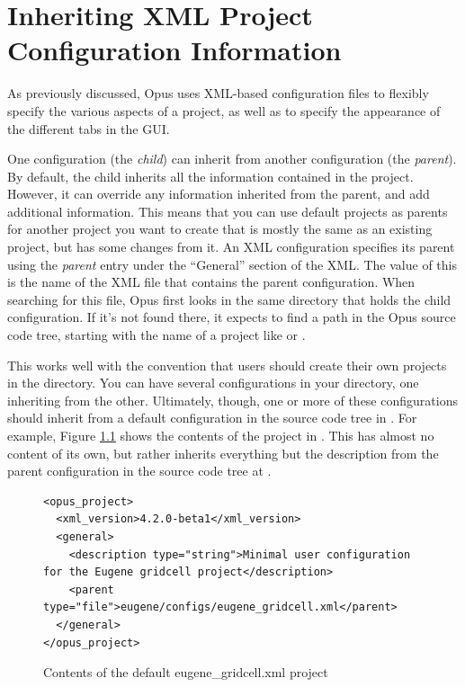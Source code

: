 \chapter{Inheriting XML Project Configuration Information}
\label{chapter:xml-inheritance}

As previously discussed, Opus uses XML-based configuration files to
flexibly specify the various aspects of a project, as well as to specify the
appearance of the different tabs in the GUI\@.

One configuration (the \emph{child}) can inherit from another configuration
(the \emph{parent}).  By default, the child inherits all the information
contained in the project.  However, it can override any information
inherited from the parent, and add additional information.  This means that
you can use default projects as parents for another project you want to
create that is mostly the same as an existing project, but has some changes
from it.  An XML configuration specifies its parent using the \emph{parent}
entry under the ``General'' section of the XML\@.  The value of this is the
name of the XML file that contains the parent configuration.  When
searching for this file, Opus first looks in the same directory that holds
the child configuration.  If it's not found there, it expects to find a
path in the Opus source code tree, starting with the name of a project like
 or .

This works well with the convention that users should create their own
projects in the  directory.  You can have
several configurations in your  directory, one
inheriting from the other.  Ultimately, though, one or more of these
configurations should inherit from a default configuration in the source
code tree in .  For example, Figure
\ref{fig:eugene-gridcell-xml-default} shows the contents of the
 project in .  This
has almost no content of its own, but rather inherits everything but the
description from the parent configuration in the source code tree at
.

\begin{figure}[htp]
\begin{center}
\begin{verbatim}
<opus_project>
  <xml_version>4.2.0-beta1</xml_version>
  <general>
    <description type="string">Minimal user configuration for the Eugene gridcell project</description>
    <parent type="file">eugene/configs/eugene_gridcell.xml</parent>
  </general>
</opus_project>
\end{verbatim}
\end{center}
\caption{Contents of the default eugene\_gridcell.xml project}
\label{fig:eugene-gridcell-xml-default}
\end{figure}

